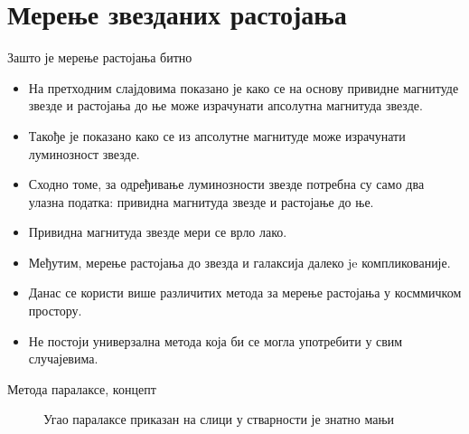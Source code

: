 \documentclass[aspectratio=169, xcolor=table, 10pt]{beamer}
\begin{document}
\section{Мерење звезданих растојања}

\begin{frame}{Зашто је мерење растојања битно}
  \begin{itemize}
    \item На претходним слајдовима показано је како се на основу привидне магнитуде звезде и растојања до ње може израчунати апсолутна магнитуда звезде.
    \item Такође је показано како се из апсолутне магнитуде може израчунати луминозност звезде.
    \item Сходно томе, за одређивање луминозности звезде потребна су само два улазна податка: привидна магнитуда звезде и растојање до ње.
    \item Привидна магнитуда звезде мери се врло лако.
    \item Међутим, мерење растојања до звезда и галаксија далеко je компликованије.
    \item Данас се користи више различитих метода за мерење растојања у косммичком простору.
    \item Не постоји универзална метода која би се могла употребити у свим случајевима.
  \end{itemize}
\end{frame}

\begin{frame}{Метода паралаксе, концепт}
  \begin{figure}
    \centering
    \captionsetup{width=\wd0}
    \caption{Угао паралаксе приказан на слици у стварности је знатно мањи}
  \end{figure}
\end{frame}
\end{document}
